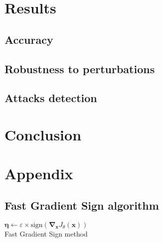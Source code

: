 \documentclass[11pt,twocolumn,letterpaper]{article}
\begin{document}
\section{Results}
\label{sec:results}

\subsection{Accuracy}

\paragraph{} 

\subsection{Robustness to perturbations}

\paragraph{} 

\subsection{Attacks detection}

\paragraph{} 


\section{Conclusion}
\label{sec:conclusion}


\section{Appendix}
\label{sec:appendix}

\subsection{Fast Gradient Sign algorithm}

\begin{algorithm}
\SetAlgoLined
{}
\KwOutput{$\bm{\eta}$}
$\bm{\eta} \leftarrow \varepsilon \times \text{sign}(\bm{\nabla}_{\bm{x}} J_{\theta}(\bm{x}))$ \\
\caption{Fast Gradient Sign method}
\label{algo:fgs}
\end{algorithm}
\end{document}
